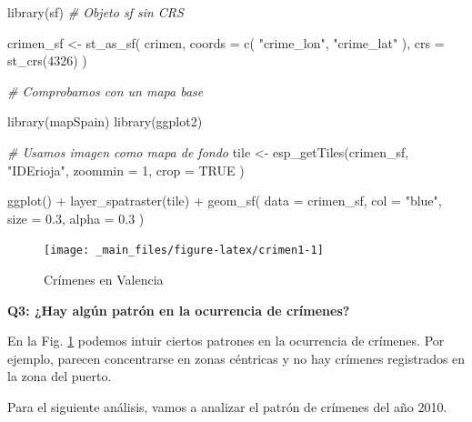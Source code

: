 \documentclass[
]{report}
\newenvironment{Shaded}{\begin{snugshade}}{\end{snugshade}}
\newcommand{\AttributeTok}[1]{\textcolor[rgb]{0.77,0.63,0.00}{#1}}
\newcommand{\CommentTok}[1]{\textcolor[rgb]{0.56,0.35,0.01}{\textit{#1}}}
\newcommand{\ConstantTok}[1]{\textcolor[rgb]{0.00,0.00,0.00}{#1}}
\newcommand{\DecValTok}[1]{\textcolor[rgb]{0.00,0.00,0.81}{#1}}
\newcommand{\FloatTok}[1]{\textcolor[rgb]{0.00,0.00,0.81}{#1}}
\newcommand{\FunctionTok}[1]{\textcolor[rgb]{0.00,0.00,0.00}{#1}}
\newcommand{\NormalTok}[1]{#1}
\newcommand{\OtherTok}[1]{\textcolor[rgb]{0.56,0.35,0.01}{#1}}
\newcommand{\SpecialCharTok}[1]{\textcolor[rgb]{0.00,0.00,0.00}{#1}}
\newcommand{\StringTok}[1]{\textcolor[rgb]{0.31,0.60,0.02}{#1}}
\theoremstyle{definition}
\theoremstyle{definition}
\theoremstyle{definition}
\theoremstyle{definition}
\theoremstyle{remark}
\begin{document}
\begin{Shaded}
\begin{Highlighting}[]

\FunctionTok{library}\NormalTok{(sf)}
\CommentTok{\# Objeto sf sin CRS}

\NormalTok{crimen\_sf }\OtherTok{\textless{}{-}} \FunctionTok{st\_as\_sf}\NormalTok{(}
\NormalTok{  crimen,}
  \AttributeTok{coords =} \FunctionTok{c}\NormalTok{(}
    \StringTok{"crime\_lon"}\NormalTok{,}
    \StringTok{"crime\_lat"}
\NormalTok{  ),}
  \AttributeTok{crs =} \FunctionTok{st\_crs}\NormalTok{(}\DecValTok{4326}\NormalTok{)}
\NormalTok{)}

\CommentTok{\# Comprobamos con un mapa base}

\FunctionTok{library}\NormalTok{(mapSpain)}
\FunctionTok{library}\NormalTok{(ggplot2)}

\CommentTok{\# Usamos imagen como mapa de fondo}
\NormalTok{tile }\OtherTok{\textless{}{-}} \FunctionTok{esp\_getTiles}\NormalTok{(crimen\_sf, }\StringTok{"IDErioja"}\NormalTok{,}
  \AttributeTok{zoommin =} \DecValTok{1}\NormalTok{,}
  \AttributeTok{crop =} \ConstantTok{TRUE}
\NormalTok{)}

\FunctionTok{ggplot}\NormalTok{() }\SpecialCharTok{+}
  \FunctionTok{layer\_spatraster}\NormalTok{(tile) }\SpecialCharTok{+}
  \FunctionTok{geom\_sf}\NormalTok{(}
    \AttributeTok{data =}\NormalTok{ crimen\_sf,}
    \AttributeTok{col =} \StringTok{"blue"}\NormalTok{,}
    \AttributeTok{size =} \FloatTok{0.3}\NormalTok{,}
    \AttributeTok{alpha =} \FloatTok{0.3}
\NormalTok{  )}
\end{Highlighting}
\end{Shaded}

\begin{figure}

{\centering \texttt{[image: \_main\_files/figure-latex/crimen1-1]} 

}

\caption{Crímenes en Valencia}\label{fig:crimen1}
\end{figure}

\textbf{Q3: ¿Hay algún patrón en la ocurrencia de crímenes?}

En la Fig. \ref{fig:crimen1} podemos intuir ciertos patrones en la ocurrencia
de crímenes. Por ejemplo, parecen concentrarse en zonas céntricas y no hay
crímenes registrados en la zona del puerto.

Para el siguiente análisis, vamos a analizar el patrón de crímenes del año 2010.
\end{document}
